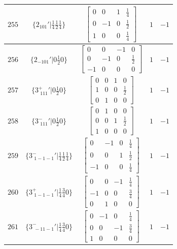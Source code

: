 \documentclass[fleqn,8pt]{jsarticle}
\begin{document}
\begin{longtable}{ccccc}
$ 255 $ & $ \{2{}_{101}{}'|\frac{1}{4} \frac{1}{2} \frac{1}{4}\} $ & $ \begin{bmatrix} 0 & 0 & 1 & \frac{1}{4} \\ 0 & -1 & 0 & \frac{1}{2} \\ 1 & 0 & 0 & \frac{1}{4} \end{bmatrix} $ & $ 1 $ & $ -1 $ \\ \hline
$ 256 $ & $ \{2{}_{-101}{}'|0 \frac{1}{2} 0\} $ & $ \begin{bmatrix} 0 & 0 & -1 & 0 \\ 0 & -1 & 0 & \frac{1}{2} \\ -1 & 0 & 0 & 0 \end{bmatrix} $ & $ 1 $ & $ -1 $ \\ \hline
$ 257 $ & $ \{3^{+}_{\,\,111}{}'|0 \frac{1}{2} 0\} $ & $ \begin{bmatrix} 0 & 0 & 1 & 0 \\ 1 & 0 & 0 & \frac{1}{2} \\ 0 & 1 & 0 & 0 \end{bmatrix} $ & $ 1 $ & $ -1 $ \\ \hline
$ 258 $ & $ \{3^{-}_{\,\,111}{}'|0 \frac{1}{2} 0\} $ & $ \begin{bmatrix} 0 & 1 & 0 & 0 \\ 0 & 0 & 1 & \frac{1}{2} \\ 1 & 0 & 0 & 0 \end{bmatrix} $ & $ 1 $ & $ -1 $ \\ \hline
$ 259 $ & $ \{3^{-}_{\,\,1-1-1}{}'|\frac{1}{4} \frac{1}{2} \frac{1}{4}\} $ & $ \begin{bmatrix} 0 & -1 & 0 & \frac{1}{4} \\ 0 & 0 & 1 & \frac{1}{2} \\ -1 & 0 & 0 & \frac{1}{4} \end{bmatrix} $ & $ 1 $ & $ -1 $ \\ \hline
$ 260 $ & $ \{3^{+}_{\,\,1-1-1}{}'|\frac{1}{4} \frac{3}{4} 0\} $ & $ \begin{bmatrix} 0 & 0 & -1 & \frac{1}{4} \\ -1 & 0 & 0 & \frac{3}{4} \\ 0 & 1 & 0 & 0 \end{bmatrix} $ & $ 1 $ & $ -1 $ \\ \hline
$ 261 $ & $ \{3^{-}_{\,\,-11-1}{}'|\frac{1}{4} \frac{3}{4} 0\} $ & $ \begin{bmatrix} 0 & -1 & 0 & \frac{1}{4} \\ 0 & 0 & -1 & \frac{3}{4} \\ 1 & 0 & 0 & 0 \end{bmatrix} $ & $ 1 $ & $ -1 $ \\ \hline

\end{longtable}
\end{document}
